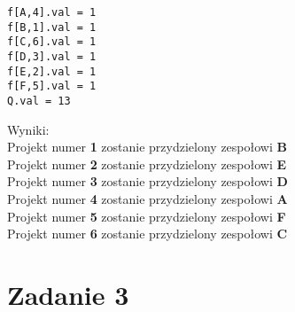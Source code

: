\documentclass[12pt]{article}
\begin{document}
\begin{lstlisting}[caption=wynik z glpk]
f[A,4].val = 1
f[B,1].val = 1
f[C,6].val = 1
f[D,3].val = 1
f[E,2].val = 1
f[F,5].val = 1
Q.val = 13
\end{lstlisting}
Wyniki: \\
Projekt numer \textbf{1} zostanie przydzielony zespołowi \textbf{B} \\
Projekt numer \textbf{2} zostanie przydzielony zespołowi \textbf{E} \\
Projekt numer \textbf{3} zostanie przydzielony zespołowi \textbf{D} \\
Projekt numer \textbf{4} zostanie przydzielony zespołowi \textbf{A} \\
Projekt numer \textbf{5} zostanie przydzielony zespołowi \textbf{F} \\
Projekt numer \textbf{6} zostanie przydzielony zespołowi \textbf{C} \\
\section{Zadanie 3}
\end{document}
